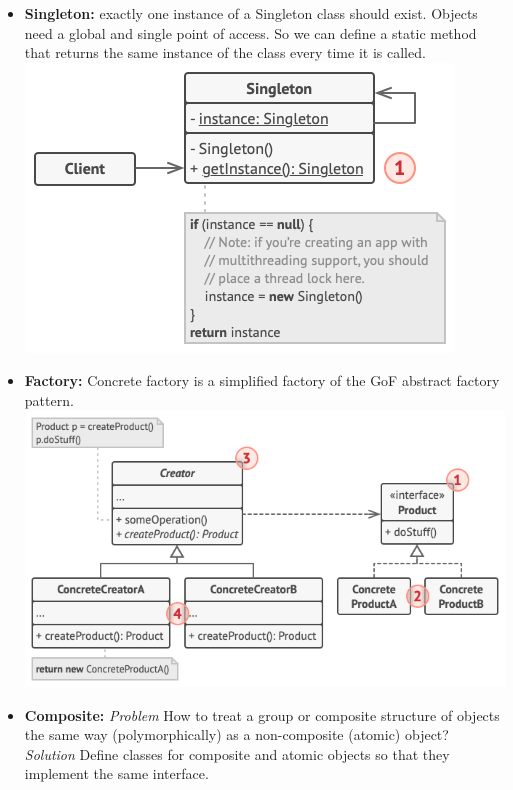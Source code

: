 \begin{itemize}
    \item \textbf{Singleton:} exactly one instance of a Singleton class should exist. Objects need a global and single point of access. So we can define a static method that returns the same instance of the class every time it is called.\\
    \includegraphics[width=\linewidth]{figs/singleton.png}\\
    \item \textbf{Factory:} Concrete factory is a simplified factory of the GoF abstract factory pattern.\\
    \includegraphics[width=\linewidth]{figs/factory.png}\\
    \item \textbf{Composite:} \textit{Problem} How to treat a group or composite structure of objects the same way (polymorphically) as a non-composite (atomic) object?\\
    \textit{Solution} Define classes for composite and atomic objects so that they implement the same interface.\\

\end{itemize}
